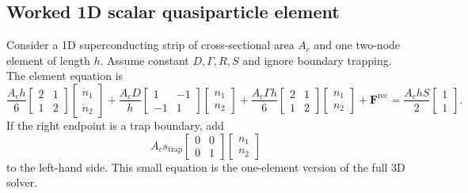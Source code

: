 \documentclass[11pt]{article}
\newcommand{\trap}{\mathrm{trap}}
\newcommand{\rec}{\mathrm{rec}}
\begin{document}
\subsection{Worked 1D scalar quasiparticle element}
Consider a 1D superconducting strip of cross-sectional area $A_c$ and one two-node element of length $h$. Assume constant $D,\Gamma,R,S$ and ignore boundary trapping. The element equation is
\begin{equation}
\frac{A_ch}{6}
\begin{bmatrix}2&1\\1&2\end{bmatrix}
\begin{bmatrix}\dot n_1\\\dot n_2\end{bmatrix}
+\frac{A_cD}{h}
\begin{bmatrix}1&-1\\-1&1\end{bmatrix}
\begin{bmatrix}n_1\\n_2\end{bmatrix}
+\frac{A_c\Gamma h}{6}
\begin{bmatrix}2&1\\1&2\end{bmatrix}
\begin{bmatrix}n_1\\n_2\end{bmatrix}
+\bm{F}^{\rec}
=\frac{A_chS}{2}
\begin{bmatrix}1\\1\end{bmatrix}.
\end{equation}
If the right endpoint is a trap boundary, add
\begin{equation}
A_cs_{\trap}
\begin{bmatrix}0&0\\0&1\end{bmatrix}
\begin{bmatrix}n_1\\n_2\end{bmatrix}
\end{equation}
to the left-hand side. This small equation is the one-element version of the full 3D solver.
\end{document}
